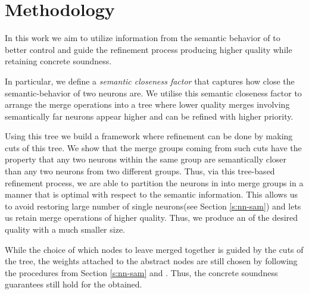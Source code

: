 \section{Methodology}
\label{s:semantic-closeness}




 
In this work we aim to utilize information from the semantic behavior of \cnc to
better control and guide the refinement process producing higher quality \abs
while retaining concrete soundness. 

In particular, we define a \textit{semantic
closeness factor} that captures how close the semantic-behavior of two 
neurons are. We utilise this semantic closeness factor to arrange the merge
operations into a tree where lower quality merges involving semantically far
neurons appear higher and can be refined with higher priority. 

Using this tree we build a framework  where refinement can
be done by making cuts of this tree. We show that the merge groups coming from
such cuts have the property that any two neurons within the same group are 
semantically closer than any two neurons from two different groups. Thus, via
this tree-based refinement process, we are able to partition the neurons in \cnc
into merge groups in a manner that is
optimal with respect to the semantic information.
This allows us to avoid restoring large number of single neurons(see Section
\ref{s:nn-sam}) and lets us retain merge operations of higher quality. Thus, we
produce an \abs of the desired quality with a much smaller size. 

While the choice of which nodes to leave merged together is guided by the cuts
of the tree, the weights attached to the abstract nodes are still chosen
by following the procedures from Section \ref{s:nn-sam} and \cite{cegar-nn}.
Thus, the concrete soundness guarantees still hold for the \abs obtained.

